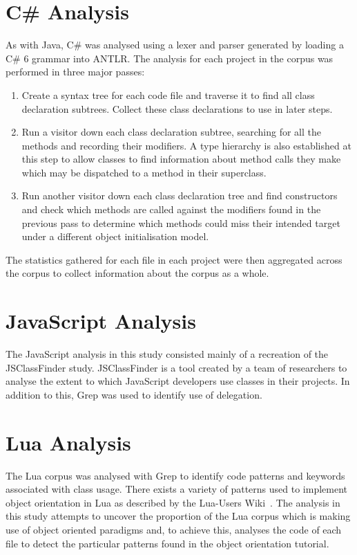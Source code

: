 \section{C\# Analysis}
As with Java, C\# was analysed using a lexer and parser generated by loading a C\# 6 grammar into ANTLR. The analysis for each project in the corpus was performed in three major passes:
\begin{enumerate}
	\item Create a syntax tree for each code file and traverse it to find all class declaration subtrees. Collect these class declarations to use in later steps.
	\item Run a visitor down each class declaration subtree, searching for all the methods and recording their modifiers. A type hierarchy is also established at this step to allow classes to find information about method calls they make which may be dispatched to a method in their superclass.
	\item Run another visitor down each class declaration tree and find constructors and check which methods are called against the modifiers found in the previous pass to determine which methods could miss their intended target under a different object initialisation model.
\end{enumerate}
The statistics gathered for each file in each project were then aggregated across the corpus to collect information about the corpus as a whole.

\section{JavaScript Analysis}
The JavaScript analysis in this study consisted mainly of a recreation of the JSClassFinder study. JSClassFinder is a tool created by a team of researchers to analyse the extent to which JavaScript developers use classes in their projects. In addition to this, Grep was used to identify use of delegation.

\section{Lua Analysis}
The Lua corpus was analysed with Grep to identify code patterns and keywords associated with class usage. There exists a variety of patterns used to implement object orientation in Lua as described by the Lua-Users Wiki~\cite{LuaObjectOrientation}. The analysis in this study attempts to uncover the proportion of the Lua corpus which is making use of object oriented paradigms and, to achieve this, analyses the code of each file to detect the particular patterns found in the object orientation tutorial.
\newline

